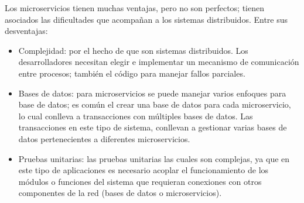 Los  microservicios tienen muchas ventajas, pero no son perfectos; tienen asociados las dificultades que acompañan  a los sistemas distribuidos. 
 Entre sus desventajas:
 
 \begin{itemize}
 	\item Complejidad: por el hecho de que son sistemas distribuidos. Los desarrolladores necesitan elegir e implementar un mecanismo de comunicación entre procesos;  también el  código para manejar fallos parciales.
 	\item Bases de datos: para microservicios se puede manejar varios enfoques para base de datos; es común  el crear una base de datos para cada microservicio, lo cual conlleva a transacciones con múltiples bases de datos. Las transacciones en este tipo de sistema, conllevan a gestionar varias bases de datos pertenecientes a diferentes microservicios.
 	\item Pruebas unitarias:  las pruebas unitarias las cuales son complejas, ya que en este tipo de aplicaciones es necesario acoplar el funcionamiento de los módulos o funciones del sistema que requieran conexiones con otros componentes de la red (bases de datos o microservicios). 
 \end{itemize}

